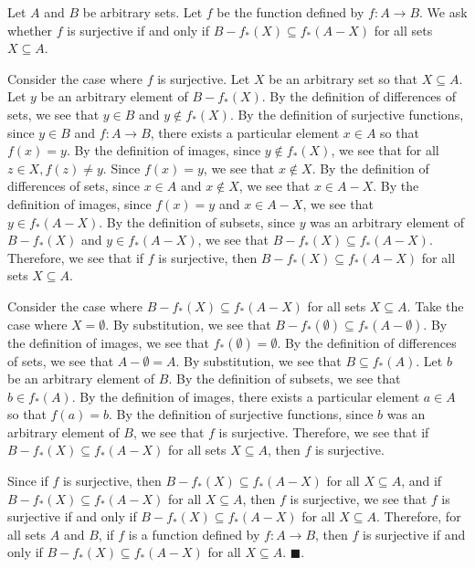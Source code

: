 \documentclass{article}
\theoremstyle{definition}
\renewcommand{\qed}{\blacksquare}
\newcommand{\img}{_{*}}
\begin{document}
	Let $A$ and $B$ be arbitrary sets.
	Let $f$ be the function defined by $f : A \rightarrow B$.
	We ask whether $f$ is surjective if and only if $B - f \img (X) \subseteq f \img (A - X)$ for all sets $X \subseteq A$.

	Consider the case where $f$ is surjective.
	Let $X$ be an arbitrary set so that $X \subseteq A$.
	Let $y$ be an arbitrary element of $B - f \img (X)$.
	By the definition of differences of sets, we see that $y \in B$ and $y \not \in f \img (X)$.
	By the definition of surjective functions, since $y \in B$ and $f : A \rightarrow B$, there exists a particular element $x \in A$ so that $f(x) = y$.
	By the definition of images, since $y \not \in f \img (X)$, we see that for all $z \in X, f(z) \neq y$.
	Since $f(x) = y$, we see that $x \not \in X$.
	By the definition of differences of sets, since $x \in A$ and $x \not \in X$, we see that $x \in A - X$.
	By the definition of images, since $f(x) = y$ and $x \in A - X$, we see that $y \in f \img (A - X)$.
	By the definition of subsets, since $y$ was an arbitrary element of $B - f \img (X)$ and $y \in f \img (A - X)$, we see that $B - f \img (X) \subseteq f \img (A - X)$.
	Therefore, we see that if $f$ is surjective, then $B - f \img (X) \subseteq f \img (A - X)$ for all sets $X \subseteq A$.

	Consider the case where $B - f \img (X) \subseteq f \img (A - X)$ for all sets $X \subseteq A$.
	Take the case where $X = \emptyset$.
	By substitution, we see that $B - f \img (\emptyset) \subseteq f \img (A - \emptyset)$.
	By the definition of images, we see that $f \img (\emptyset) = \emptyset$.
	By the definition of differences of sets, we see that $A - \emptyset = A$.
	By substitution, we see that $B \subseteq f \img (A)$.
	Let $b$ be an arbitrary element of $B$.
	By the definition of subsets, we see that $b \in f \img (A)$.
	By the definition of images, there exists a particular element $a \in A$ so that $f(a) = b$.
	By the definition of surjective functions, since $b$ was an arbitrary element of $B$, we see that $f$ is surjective.
	Therefore, we see that if $B - f \img (X) \subseteq f \img (A - X)$ for all sets $X \subseteq A$, then $f$ is surjective.

	Since if $f$ is surjective, then $B - f \img (X) \subseteq f \img (A - X)$ for all $X \subseteq A$, and if $B - f \img (X) \subseteq f \img (A - X)$ for all $X \subseteq A$, then $f$ is surjective, we see that $f$ is surjective if and only if $B - f \img (X) \subseteq f \img (A - X)$ for all $X \subseteq A$.
	Therefore, for all sets $A$ and $B$, if $f$ is a function defined by $f : A \rightarrow B$, then $f$ is surjective if and only if $B - f \img (X) \subseteq f \img (A - X)$ for all $X \subseteq A$.
	$\qed$.

	\vspace{0.5cm}

\end{document}
